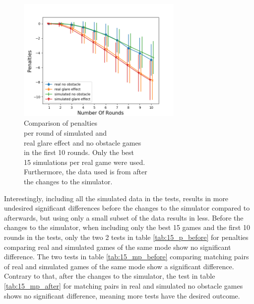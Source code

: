 \begin{minipage}{0.5\textwidth}
	\begin{figure}[H]
		\centering
		\includegraphics[width=8cm]{images/sd15x_10rounds/Figure_4.png}
		\caption[Comparison of penalties per round of simulated and real glare effect and no obstacle games in the first 10 rounds. Only the best 15 simulations per real game were used. Furthermore, the data used is from after the changes to the simulator.]{Comparison of penalties\\\hspace{0\textwidth} per round of simulated and\\\hspace{0\textwidth} real glare effect and no obstacle games\\\hspace{0\textwidth} in the first 10 rounds. Only the best \\\hspace{0\textwidth} 15 simulations per real game were used. \\\hspace{0\textwidth} Furthermore, the data used is from after\\\hspace{0\textwidth} the changes to the simulator.}
		\label{fig:simOp152}
	\end{figure}
\end{minipage} 


Interestingly, including all the simulated data in the tests, results in more undesired significant differences before the changes to the simulator compared to afterwards, but using only a small subset of the data results in less. 
Before the changes to the simulator, when including only the best 15 games and the first 10 rounds in the tests, only the two 2 tests in table \ref{tab:15_p_before} for penalties comparing real and simulated games of the same mode show no significant difference. The two tests in table \ref{tab:15_mp_before} comparing matching pairs of real and simulated games of the same mode show a significant difference. Contrary to that, after the changes to the simulator, the test in table \ref{tab:15_mp_after} for matching pairs in real and simulated no obstacle games shows no significant difference, meaning more tests have the desired outcome. 

